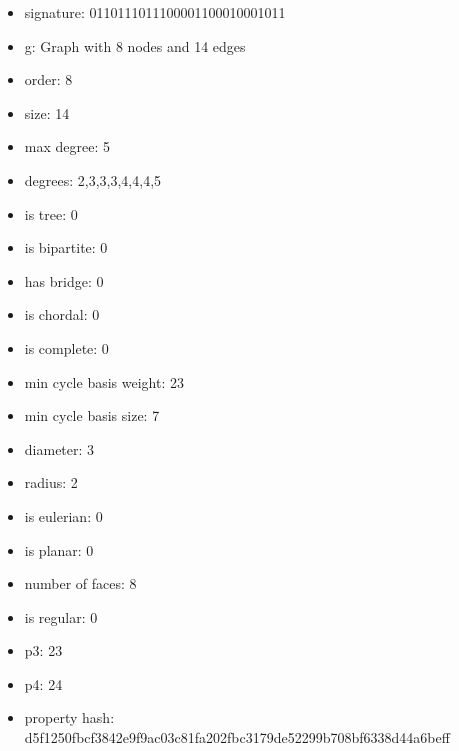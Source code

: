 \begin{itemize}
\item signature: 0110111011100001100010001011
\item g: Graph with 8 nodes and 14 edges
\item order: 8
\item size: 14
\item max degree: 5
\item degrees: 2,3,3,3,4,4,4,5
\item is tree: 0
\item is bipartite: 0
\item has bridge: 0
\item is chordal: 0
\item is complete: 0
\item min cycle basis weight: 23
\item min cycle basis size: 7
\item diameter: 3
\item radius: 2
\item is eulerian: 0
\item is planar: 0
\item number of faces: 8
\item is regular: 0
\item p3: 23
\item p4: 24
\item property hash: d5f1250fbcf3842e9f9ac03c81fa202fbc3179de52299b708bf6338d44a6beff
\end{itemize}
\newpage
\begin{figure}
\end{figure}

